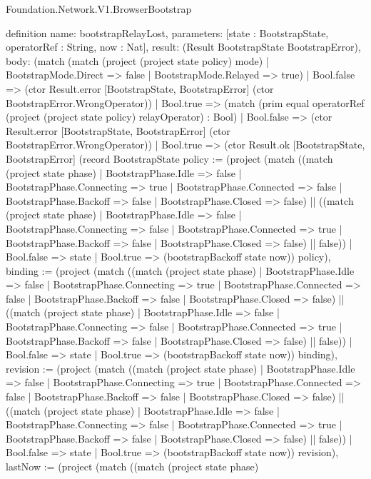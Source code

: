 \begin{lexlean}{Foundation.Network.V1.BrowserBootstrap}
\begin{semanticmodule}
definition{
  name: bootstrapRelayLost,
  parameters: [state : BootstrapState, operatorRef : String, now : Nat],
  result: (Result BootstrapState BootstrapError),
  body: (match (match (project (project state policy) mode)
      | BootstrapMode.Direct => false
      | BootstrapMode.Relayed => true)
    | Bool.false => (ctor Result.error [BootstrapState, BootstrapError] (ctor BootstrapError.WrongOperator))
    | Bool.true => (match (prim equal operatorRef (project (project state policy) relayOperator) : Bool)
      | Bool.false => (ctor Result.error [BootstrapState, BootstrapError] (ctor BootstrapError.WrongOperator))
      | Bool.true => (ctor Result.ok [BootstrapState, BootstrapError] (record BootstrapState {policy := (project (match ((match (project state phase)
          | BootstrapPhase.Idle => false
          | BootstrapPhase.Connecting => true
          | BootstrapPhase.Connected => false
          | BootstrapPhase.Backoff => false
          | BootstrapPhase.Closed => false) || ((match (project state phase)
          | BootstrapPhase.Idle => false
          | BootstrapPhase.Connecting => false
          | BootstrapPhase.Connected => true
          | BootstrapPhase.Backoff => false
          | BootstrapPhase.Closed => false) || false))
        | Bool.false => state
        | Bool.true => (bootstrapBackoff state now)) policy), binding := (project (match ((match (project state phase)
          | BootstrapPhase.Idle => false
          | BootstrapPhase.Connecting => true
          | BootstrapPhase.Connected => false
          | BootstrapPhase.Backoff => false
          | BootstrapPhase.Closed => false) || ((match (project state phase)
          | BootstrapPhase.Idle => false
          | BootstrapPhase.Connecting => false
          | BootstrapPhase.Connected => true
          | BootstrapPhase.Backoff => false
          | BootstrapPhase.Closed => false) || false))
        | Bool.false => state
        | Bool.true => (bootstrapBackoff state now)) binding), revision := (project (match ((match (project state phase)
          | BootstrapPhase.Idle => false
          | BootstrapPhase.Connecting => true
          | BootstrapPhase.Connected => false
          | BootstrapPhase.Backoff => false
          | BootstrapPhase.Closed => false) || ((match (project state phase)
          | BootstrapPhase.Idle => false
          | BootstrapPhase.Connecting => false
          | BootstrapPhase.Connected => true
          | BootstrapPhase.Backoff => false
          | BootstrapPhase.Closed => false) || false))
        | Bool.false => state
        | Bool.true => (bootstrapBackoff state now)) revision), lastNow := (project (match ((match (project state phase)
}}
\end{semanticmodule}
\end{lexlean}
